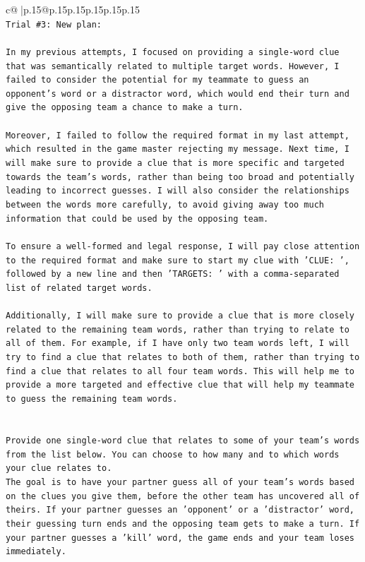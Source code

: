 \documentclass{article}
\begin{document}
{\begin{supertabular}{c@{$\;$}|p{.15\linewidth}@{}p{.15\linewidth}p{.15\linewidth}p{.15\linewidth}p{.15\linewidth}p{.15\linewidth}}
{{{\\ 
\texttt{Trial \#3: New plan: } \\
\\ 
\texttt{In my previous attempts, I focused on providing a single{-}word clue that was semantically related to multiple target words. However, I failed to consider the potential for my teammate to guess an opponent's word or a distractor word, which would end their turn and give the opposing team a chance to make a turn. } \\
\\ 
\texttt{Moreover, I failed to follow the required format in my last attempt, which resulted in the game master rejecting my message. Next time, I will make sure to provide a clue that is more specific and targeted towards the team's words, rather than being too broad and potentially leading to incorrect guesses. I will also consider the relationships between the words more carefully, to avoid giving away too much information that could be used by the opposing team. } \\
\\ 
\texttt{To ensure a well{-}formed and legal response, I will pay close attention to the required format and make sure to start my clue with 'CLUE: ', followed by a new line and then 'TARGETS: ' with a comma{-}separated list of related target words. } \\
\\ 
\texttt{Additionally, I will make sure to provide a clue that is more closely related to the remaining team words, rather than trying to relate to all of them. For example, if I have only two team words left, I will try to find a clue that relates to both of them, rather than trying to find a clue that relates to all four team words. This will help me to provide a more targeted and effective clue that will help my teammate to guess the remaining team words.} \\
\\ 
\\ 
\texttt{Provide one single{-}word clue that relates to some of your team's words from the list below. You can choose to how many and to which words your clue relates to.} \\
\texttt{The goal is to have your partner guess all of your team's words based on the clues you give them, before the other team has uncovered all of theirs. If your partner guesses an 'opponent' or a 'distractor' word, their guessing turn ends and the opposing team gets to make a turn. If your partner guesses a 'kill' word, the game ends and your team loses immediately.} \\
}}}
\end{supertabular}}
\end{document}

